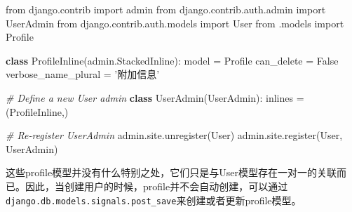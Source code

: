 \documentclass[]{article}
\newenvironment{Shaded}{}{}
\newcommand{\KeywordTok}[1]{\textcolor[rgb]{0.00,0.44,0.13}{\textbf{#1}}}
\newcommand{\StringTok}[1]{\textcolor[rgb]{0.25,0.44,0.63}{#1}}
\newcommand{\ImportTok}[1]{#1}
\newcommand{\CommentTok}[1]{\textcolor[rgb]{0.38,0.63,0.69}{\textit{#1}}}
\newcommand{\VariableTok}[1]{\textcolor[rgb]{0.10,0.09,0.49}{#1}}
\newcommand{\OperatorTok}[1]{\textcolor[rgb]{0.40,0.40,0.40}{#1}}
\newcommand{\NormalTok}[1]{#1}
\begin{document}
\begin{Shaded}
\begin{Highlighting}[]
\ImportTok{from}\NormalTok{ django.contrib }\ImportTok{import}\NormalTok{ admin}
\ImportTok{from}\NormalTok{ django.contrib.auth.admin }\ImportTok{import}\NormalTok{ UserAdmin}
\ImportTok{from}\NormalTok{ django.contrib.auth.models }\ImportTok{import}\NormalTok{ User}
\ImportTok{from}\NormalTok{ .models }\ImportTok{import}\NormalTok{ Profile}

\KeywordTok{class}\NormalTok{ ProfileInline(admin.StackedInline):}
\NormalTok{    model }\OperatorTok{=}\NormalTok{ Profile}
\NormalTok{    can_delete }\OperatorTok{=} \VariableTok{False}
\NormalTok{    verbose_name_plural }\OperatorTok{=} \StringTok{'附加信息'}

\CommentTok{# Define a new User admin}
\KeywordTok{class}\NormalTok{ UserAdmin(UserAdmin):}
\NormalTok{    inlines }\OperatorTok{=}\NormalTok{ (ProfileInline,)}

\CommentTok{# Re-register UserAdmin}
\NormalTok{admin.site.unregister(User)}
\NormalTok{admin.site.register(User, UserAdmin)}
\end{Highlighting}
\end{Shaded}

这些profile模型并没有什么特别之处，它们只是与User模型存在一对一的关联而已。因此，当创建用户的时候，profile并不会自动创建，可以通过\texttt{django.db.models.signals.post\_save}来创建或者更新profile模型。
\end{document}
